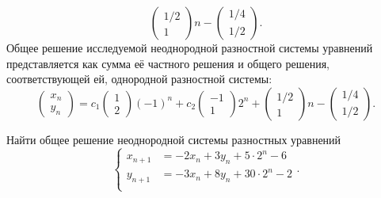 \documentclass[a4paper]{article}
\begin{document}
\begin{sol}
\[\begin{pmatrix} 1 /2 \\ 1 \end{pmatrix} n -\begin{pmatrix}  1 /4 \\ 1/2 \end{pmatrix} 
.\] 
Общее решение исследуемой неоднородной разностной системы уравнений
представляется как сумма её частного решения и общего решения, соответствующей ей,
однородной разностной системы:
\[
\begin{pmatrix} x_n\\y_n \end{pmatrix} =
c_1\begin{pmatrix} 1\\2 \end{pmatrix} (-1)^n+ c_2 \begin{pmatrix} 
-1\\ 1\end{pmatrix} 2^n+ \begin{pmatrix} 1/2 \\ 1 \end{pmatrix} n - \begin{pmatrix} 1 / 4\\1 /2 \end{pmatrix} 
.\] 
\end{sol}
\begin{hiProb}[7.15-2]
Найти общее решение неоднородной системы разностных
уравнений
\[
\left\{
\begin{aligned}
x_{n+1}&= -2x_n +3y_n+5\cdot 2^n-6 \\
y_{n+1}&= -3x_n+8y_n +30 \cdot 2^n-2 \\
\end{aligned}
\right.
.\] 
\end{hiProb}
\end{document}
